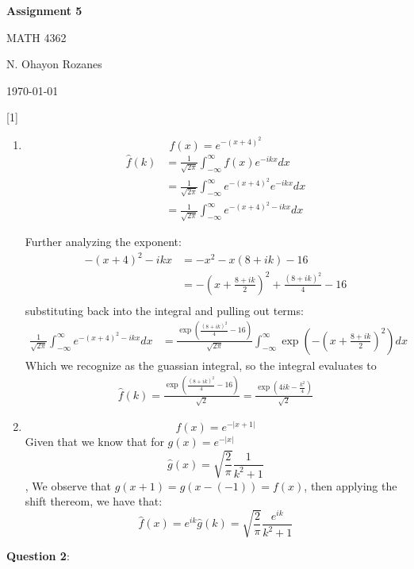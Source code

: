 \documentclass{article} %
\newcommand{\question}[2][]{
  \begin{flushleft}
    \textbf{Question #1}: \textit{#2}

\end{flushleft}}
\newcommand{\maketitletwo}[2][]{
  \begin{center}
    \Large{\textbf{Assignment #1}

    MATH 4362} %
    \vspace{5pt}

    \normalsize{N. Ohayon Rozanes  %

    \today}        %
    \vspace{15pt}

\end{center}}
\begin{document}
\maketitletwo[5]  %

\question[1]{}
\begin{enumerate}
  \item $$f(x) = e^{-(x+4)^2}$$
    \begin{align*}
      \hat f(k) &= \frac{1}{\sqrt{2\pi}}\int_{-\infty}^\infty f(x)e^{-ikx} dx\\
      &= \frac{1}{\sqrt{2\pi}}\int_{-\infty}^\infty e^{-(x+4)^2}e^{-ikx} dx \\
      &= \frac{1}{\sqrt{2\pi}}\int_{-\infty}^\infty e^{-(x+4)^2 - ikx} dx
    \end{align*}

    Further analyzing the exponent:
    \begin{align*}
      -(x+4)^2 - ikx &= -x^2 - x(8+ ik) - 16 \\
      &=-(x+\frac{8+ik}{2})^2 + \frac{(8+ik)^2}{4} -16\\
    \end{align*}
    substituting back into the integral and pulling out terms:
    \begin{align*}
      \frac{1}{\sqrt{2\pi}}\int_{-\infty}^\infty e^{-(x+4)^2 - ikx}
      dx &= \frac{\exp(\frac{(8+ik)^2}{4} - 16)}{\sqrt{2\pi}}
      \int_{-\infty}^\infty \exp(-(x+\frac{8+ik}{2})^2) dx
    \end{align*}
    Which we recognize as the guassian integral, so the integral evaluates to
    \begin{align*}
      \hat f(k) = \frac{\exp(\frac{(8+ik)^2}{4} - 16)}{\sqrt{2}} =
      \frac{\exp(4ik -\frac{k^2}{4})}{\sqrt{2}}
    \end{align*}
  \item
    $$f(x) = e^{-|x+1|}$$
    Given that we know that for $g(x) = e^{-|x|}$ $$\hat g(x) =
    \sqrt{\frac{2}{\pi}}\frac{1}{k^2+1}$$,
    We observe that $g(x+1) = g(x-(-1)) = f(x)$, then applying the
    shift thereom,
    we have that:
    $$
    \hat f(x) = e^{ik}\hat g(k)  = \sqrt{\frac{2}{\pi}}\frac{e^{ik}}{k^2+1}
    $$
\end{enumerate}
\question[2]{}
\end{document}
